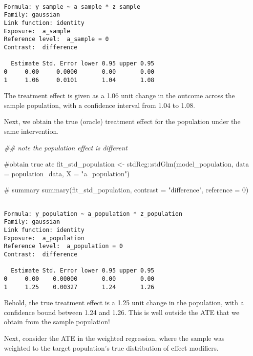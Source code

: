 \documentclass[
  singlecolumn]{article}
\newenvironment{Shaded}{\begin{snugshade}}{\end{snugshade}}
\newcommand{\AttributeTok}[1]{\textcolor[rgb]{0.40,0.45,0.13}{#1}}
\newcommand{\CommentTok}[1]{\textcolor[rgb]{0.37,0.37,0.37}{#1}}
\newcommand{\DecValTok}[1]{\textcolor[rgb]{0.68,0.00,0.00}{#1}}
\newcommand{\DocumentationTok}[1]{\textcolor[rgb]{0.37,0.37,0.37}{\textit{#1}}}
\newcommand{\FunctionTok}[1]{\textcolor[rgb]{0.28,0.35,0.67}{#1}}
\newcommand{\NormalTok}[1]{\textcolor[rgb]{0.00,0.23,0.31}{#1}}
\newcommand{\OtherTok}[1]{\textcolor[rgb]{0.00,0.23,0.31}{#1}}
\newcommand{\SpecialCharTok}[1]{\textcolor[rgb]{0.37,0.37,0.37}{#1}}
\newcommand{\StringTok}[1]{\textcolor[rgb]{0.13,0.47,0.30}{#1}}
\begin{document}
\begin{verbatim}

Formula: y_sample ~ a_sample * z_sample
Family: gaussian 
Link function: identity 
Exposure:  a_sample 
Reference level:  a_sample = 0 
Contrast:  difference 

  Estimate Std. Error lower 0.95 upper 0.95
0     0.00     0.0000       0.00       0.00
1     1.06     0.0101       1.04       1.08
\end{verbatim}

The treatment effect is given as a 1.06 unit change in the outcome
across the sample population, with a confidence interval from 1.04 to
1.08.

Next, we obtain the true (oracle) treatment effect for the population
under the same intervention.

\begin{Shaded}
\begin{Highlighting}[]
\DocumentationTok{\#\# note the population effect is different}

\CommentTok{\#obtain true ate}
\NormalTok{fit\_std\_population }\OtherTok{\textless{}{-}}
\NormalTok{  stdReg}\SpecialCharTok{::}\FunctionTok{stdGlm}\NormalTok{(model\_population, }\AttributeTok{data =}\NormalTok{ population\_data, }\AttributeTok{X =} \StringTok{"a\_population"}\NormalTok{)}

\CommentTok{\# summary}
\FunctionTok{summary}\NormalTok{(fit\_std\_population,}
        \AttributeTok{contrast =} \StringTok{"difference"}\NormalTok{,}
        \AttributeTok{reference =} \DecValTok{0}\NormalTok{)}
\end{Highlighting}
\end{Shaded}

\begin{verbatim}

Formula: y_population ~ a_population * z_population
Family: gaussian 
Link function: identity 
Exposure:  a_population 
Reference level:  a_population = 0 
Contrast:  difference 

  Estimate Std. Error lower 0.95 upper 0.95
0     0.00    0.00000       0.00       0.00
1     1.25    0.00327       1.24       1.26
\end{verbatim}

Behold, the true treatment effect is a 1.25 unit change in the
population, with a confidence bound between 1.24 and 1.26. This is well
outside the ATE that we obtain from the sample population!

Next, consider the ATE in the weighted regression, where the sample was
weighted to the target population's true distribution of effect
modifiers.
\end{document}
